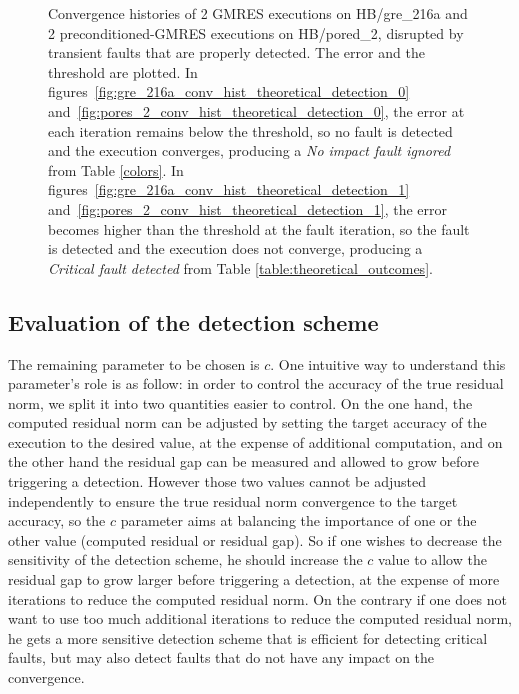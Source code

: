 \begin{figure}[h]
\begin{minipage}[b]{0.48\linewidth}
    
	\end{minipage}
\caption{Convergence histories of 2 GMRES executions on HB/gre_216a and 2 preconditioned-GMRES executions on HB/pored_2, disrupted by transient faults that are properly detected. The error and the threshold are plotted. In figures~\ref{fig:gre_216a_conv_hist_theoretical_detection_0} and~\ref{fig:pores_2_conv_hist_theoretical_detection_0}, the error at each iteration remains below the threshold, so no fault is detected and the execution converges, producing a \emph{No impact fault ignored} from Table \ref{colors}. In figures~\ref{fig:gre_216a_conv_hist_theoretical_detection_1} and~\ref{fig:pores_2_conv_hist_theoretical_detection_1}, the error becomes higher than the threshold at the fault iteration, so the fault is detected and the execution does not converge, producing a \emph{Critical fault detected} from Table \ref{table:theoretical_outcomes}. }\label{fig:conv_hist_detection_correct}
\end{figure}



\subsection{Evaluation of the detection scheme}\label{sec:evaluation_oracle}
The remaining parameter to be chosen is $c$. One intuitive way to understand this parameter's role is as follow: in order to control the accuracy of the true residual norm, we split it into two quantities easier to control. On the one hand, the computed residual norm can be adjusted by setting the target accuracy of the execution to the desired value, at the expense of additional computation, and on the other hand the residual gap can be measured and allowed to grow before triggering a detection. However those two values cannot be adjusted independently to ensure the true residual norm convergence to the target accuracy, so the $c$ parameter aims at balancing the importance of one or the other value (computed residual or residual gap). So if one wishes to decrease the sensitivity of the detection scheme, he should increase the $c$ value to allow the residual gap to grow larger before triggering a detection, at the expense of more iterations to reduce the computed residual norm. On the contrary if one does not want to use too much additional iterations to reduce the computed residual norm, he gets a more sensitive detection scheme that is efficient for detecting critical faults, but may also detect faults that do not have any impact on the convergence.



